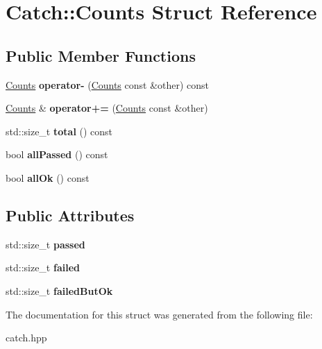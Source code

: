 \hypertarget{structCatch_1_1Counts}{}\section{Catch\+:\+:Counts Struct Reference}
\label{structCatch_1_1Counts}
\subsection*{Public Member Functions}
\begin{DoxyCompactItemize}
\item 
\hyperlink{structCatch_1_1Counts}{Counts} {\bfseries operator-\/} (\hyperlink{structCatch_1_1Counts}{Counts} const \&other) const \hypertarget{structCatch_1_1Counts_aedf86fefe33938d132a6981171cd83e6}{}\label{structCatch_1_1Counts_aedf86fefe33938d132a6981171cd83e6}

\item 
\hyperlink{structCatch_1_1Counts}{Counts} \& {\bfseries operator+=} (\hyperlink{structCatch_1_1Counts}{Counts} const \&other)\hypertarget{structCatch_1_1Counts_a322a89475cd2cc039140ef371e973677}{}\label{structCatch_1_1Counts_a322a89475cd2cc039140ef371e973677}

\item 
std\+::size\+\_\+t {\bfseries total} () const \hypertarget{structCatch_1_1Counts_a9125c662e30114e5c5cc94729b1e9e84}{}\label{structCatch_1_1Counts_a9125c662e30114e5c5cc94729b1e9e84}

\item 
bool {\bfseries all\+Passed} () const \hypertarget{structCatch_1_1Counts_adbbaca552f6017ce69e0d5dc5500bea4}{}\label{structCatch_1_1Counts_adbbaca552f6017ce69e0d5dc5500bea4}

\item 
bool {\bfseries all\+Ok} () const \hypertarget{structCatch_1_1Counts_ab2497c9dfc77be757a90225ea69595f5}{}\label{structCatch_1_1Counts_ab2497c9dfc77be757a90225ea69595f5}

\end{DoxyCompactItemize}
\subsection*{Public Attributes}
\begin{DoxyCompactItemize}
\item 
std\+::size\+\_\+t {\bfseries passed}\hypertarget{structCatch_1_1Counts_ad28daaf3de28006400208b6dd0c631e6}{}\label{structCatch_1_1Counts_ad28daaf3de28006400208b6dd0c631e6}

\item 
std\+::size\+\_\+t {\bfseries failed}\hypertarget{structCatch_1_1Counts_a19982a3817a3bc2c07f0290e71f497a3}{}\label{structCatch_1_1Counts_a19982a3817a3bc2c07f0290e71f497a3}

\item 
std\+::size\+\_\+t {\bfseries failed\+But\+Ok}\hypertarget{structCatch_1_1Counts_ac090973a2ff51394cd452718e75c073e}{}\label{structCatch_1_1Counts_ac090973a2ff51394cd452718e75c073e}

\end{DoxyCompactItemize}


The documentation for this struct was generated from the following file\+:\begin{DoxyCompactItemize}
\item 
catch.\+hpp\end{DoxyCompactItemize}
